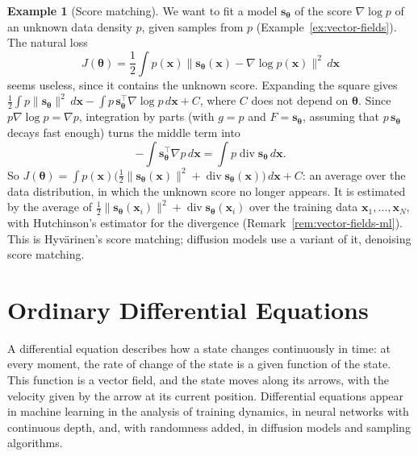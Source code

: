 \documentclass[11pt]{article}
\newcommand{\norm}[1]{\lVert #1 \rVert}
\theoremstyle{definition}
\newtheorem{example}[definition]{Example}
\theoremstyle{plain}
\theoremstyle{remark}
\DeclareMathOperator{\Div}{div}
\begin{document}
\begin{example}[Score matching]\label{ex:score-matching}
    We want to fit a model $\mathbf{s}_{\boldsymbol{\theta}}$ of the score $\nabla\log p$ of an unknown data density $p$, given samples from $p$ (Example~\ref{ex:vector-fields}). The natural loss
    \[J(\boldsymbol{\theta}) = \frac{1}{2}\int p(\mathbf{x})\norm{\mathbf{s}_{\boldsymbol{\theta}}(\mathbf{x}) - \nabla\log p(\mathbf{x})}^2\, d\mathbf{x}\]
    seems useless, since it contains the unknown score. Expanding the square gives $\frac{1}{2}\int p\norm{\mathbf{s}_{\boldsymbol{\theta}}}^2\, d\mathbf{x} - \int p\,\mathbf{s}_{\boldsymbol{\theta}}^\top\nabla\log p\, d\mathbf{x} + C$, where $C$ does not depend on $\boldsymbol{\theta}$. Since $p\nabla\log p = \nabla p$, integration by parts (with $g = p$ and $F = \mathbf{s}_{\boldsymbol{\theta}}$, assuming that $p\,\mathbf{s}_{\boldsymbol{\theta}}$ decays fast enough) turns the middle term into
    \[-\int \mathbf{s}_{\boldsymbol{\theta}}^\top\nabla p\, d\mathbf{x} = \int p\Div\mathbf{s}_{\boldsymbol{\theta}}\, d\mathbf{x}.\]
    So $J(\boldsymbol{\theta}) = \int p(\mathbf{x})\big(\frac{1}{2}\norm{\mathbf{s}_{\boldsymbol{\theta}}(\mathbf{x})}^2 + \Div\mathbf{s}_{\boldsymbol{\theta}}(\mathbf{x})\big)\, d\mathbf{x} + C$: an average over the data distribution, in which the unknown score no longer appears. It is estimated by the average of $\frac{1}{2}\norm{\mathbf{s}_{\boldsymbol{\theta}}(\mathbf{x}_i)}^2 + \Div\mathbf{s}_{\boldsymbol{\theta}}(\mathbf{x}_i)$ over the training data $\mathbf{x}_1, \ldots, \mathbf{x}_N$, with Hutchinson's estimator for the divergence (Remark~\ref{rem:vector-fields-ml}). This is Hyv\"arinen's score matching; diffusion models use a variant of it, denoising score matching.
\end{example}

\section{Ordinary Differential Equations}\label{sec:ode}

A differential equation describes how a state changes continuously in time: at every moment, the rate of change of the state is a given function of the state. This function is a vector field, and the state moves along its arrows, with the velocity given by the arrow at its current position. Differential equations appear in machine learning in the analysis of training dynamics, in neural networks with continuous depth, and, with randomness added, in diffusion models and sampling algorithms.
\end{document}
